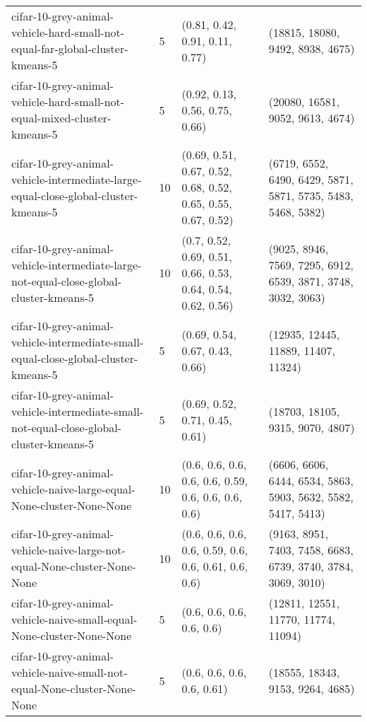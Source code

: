 \begin{longtable}{llll}
          cifar-10-grey-animal-vehicle-hard-small-not-equal-far-global-cluster-kmeans-5 &              5 &                               (0.81, 0.42, 0.91, 0.11, 0.77) &                             (18815, 18080, 9492, 8938, 4675) \\
               cifar-10-grey-animal-vehicle-hard-small-not-equal-mixed-cluster-kmeans-5 &              5 &                               (0.92, 0.13, 0.56, 0.75, 0.66) &                             (20080, 16581, 9052, 9613, 4674) \\
    cifar-10-grey-animal-vehicle-intermediate-large-equal-close-global-cluster-kmeans-5 &             10 & (0.69, 0.51, 0.67, 0.52, 0.68, 0.52, 0.65, 0.55, 0.67, 0.52) & (6719, 6552, 6490, 6429, 5871, 5871, 5735, 5483, 5468, 5382) \\
cifar-10-grey-animal-vehicle-intermediate-large-not-equal-close-global-cluster-kmeans-5 &             10 &  (0.7, 0.52, 0.69, 0.51, 0.66, 0.53, 0.64, 0.54, 0.62, 0.56) & (9025, 8946, 7569, 7295, 6912, 6539, 3871, 3748, 3032, 3063) \\
    cifar-10-grey-animal-vehicle-intermediate-small-equal-close-global-cluster-kmeans-5 &              5 &                               (0.69, 0.54, 0.67, 0.43, 0.66) &                          (12935, 12445, 11889, 11407, 11324) \\
cifar-10-grey-animal-vehicle-intermediate-small-not-equal-close-global-cluster-kmeans-5 &              5 &                               (0.69, 0.52, 0.71, 0.45, 0.61) &                             (18703, 18105, 9315, 9070, 4807) \\
                  cifar-10-grey-animal-vehicle-naive-large-equal-None-cluster-None-None &             10 &          (0.6, 0.6, 0.6, 0.6, 0.6, 0.59, 0.6, 0.6, 0.6, 0.6) & (6606, 6606, 6444, 6534, 5863, 5903, 5632, 5582, 5417, 5413) \\
              cifar-10-grey-animal-vehicle-naive-large-not-equal-None-cluster-None-None &             10 &         (0.6, 0.6, 0.6, 0.6, 0.59, 0.6, 0.6, 0.61, 0.6, 0.6) & (9163, 8951, 7403, 7458, 6683, 6739, 3740, 3784, 3069, 3010) \\
                  cifar-10-grey-animal-vehicle-naive-small-equal-None-cluster-None-None &              5 &                                    (0.6, 0.6, 0.6, 0.6, 0.6) &                          (12811, 12551, 11770, 11774, 11094) \\
              cifar-10-grey-animal-vehicle-naive-small-not-equal-None-cluster-None-None &              5 &                                   (0.6, 0.6, 0.6, 0.6, 0.61) &                             (18555, 18343, 9153, 9264, 4685) \\

\end{longtable}
